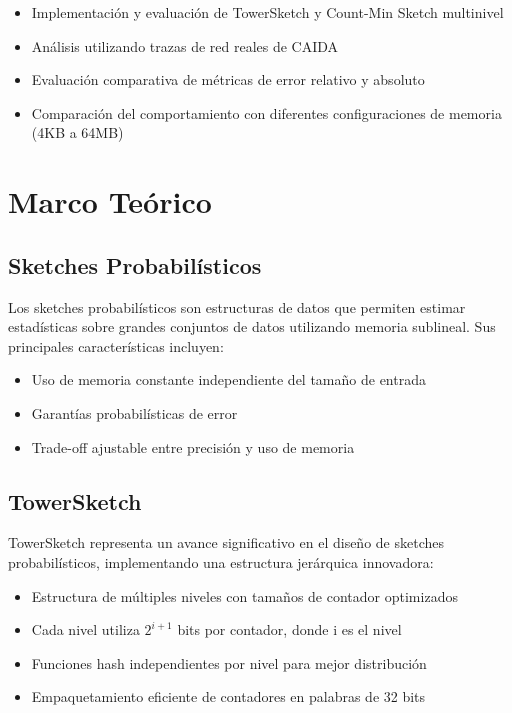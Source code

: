 \documentclass[a4paper,12pt]{article}
\begin{document}
\begin{itemize}
    \item Implementación y evaluación de TowerSketch y Count-Min Sketch multinivel
    \item Análisis utilizando trazas de red reales de CAIDA
    \item Evaluación comparativa de métricas de error relativo y absoluto
    \item Comparación del comportamiento con diferentes configuraciones de memoria (4KB a 64MB)
\end{itemize}

\newpage
\section{Marco Teórico}
\subsection{Sketches Probabilísticos}
Los sketches probabilísticos son estructuras de datos que permiten estimar estadísticas sobre grandes conjuntos de datos utilizando memoria sublineal. Sus principales características incluyen:

\begin{itemize}
    \item Uso de memoria constante independiente del tamaño de entrada
    \item Garantías probabilísticas de error
    \item Trade-off ajustable entre precisión y uso de memoria
\end{itemize}

\subsection{TowerSketch}
TowerSketch representa un avance significativo en el diseño de sketches probabilísticos, implementando una estructura jerárquica innovadora:

\begin{itemize}
    \item Estructura de múltiples niveles con tamaños de contador optimizados
    \item Cada nivel utiliza $2^{i+1}$ bits por contador, donde i es el nivel
    \item Funciones hash independientes por nivel para mejor distribución
    \item Empaquetamiento eficiente de contadores en palabras de 32 bits
\end{itemize}
\end{document}
